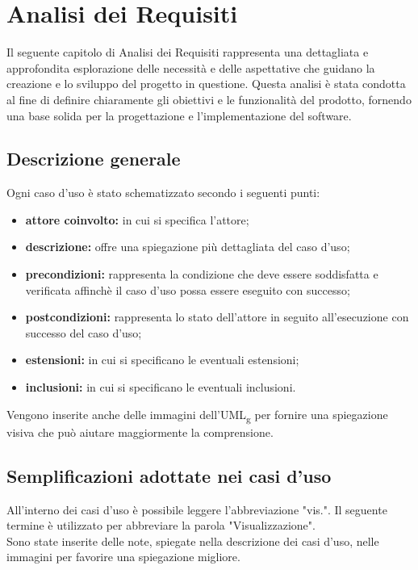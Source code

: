 \chapter{Analisi dei Requisiti}
\label{cap:analisi-requisiti}

Il seguente capitolo di Analisi dei Requisiti rappresenta una dettagliata e approfondita esplorazione delle necessità e delle aspettative che guidano la creazione e lo sviluppo del progetto in questione. Questa analisi è stata condotta al fine di definire chiaramente gli obiettivi e le funzionalità del prodotto, fornendo una base solida per la progettazione e l'implementazione del software.\\

\section{Descrizione generale}
Ogni caso d'uso è stato schematizzato secondo i seguenti punti:
\begin{itemize}
\item \textbf{attore coinvolto:} in cui si specifica l'attore;
\item \textbf{descrizione:} offre una spiegazione più dettagliata del caso d'uso; 
\item \textbf{precondizioni:} rappresenta la condizione che deve essere soddisfatta e verificata affinchè il caso d'uso possa essere eseguito con successo;
\item \textbf{postcondizioni:} rappresenta lo stato dell'attore in seguito all'esecuzione con successo del caso d'uso;
\item \textbf{estensioni:} in cui si specificano le eventuali estensioni;
\item \textbf{inclusioni:} in cui si specificano le eventuali inclusioni.
\end{itemize}
Vengono inserite anche delle immagini dell'UML\textsubscript{g} per fornire una spiegazione visiva che può aiutare maggiormente la comprensione.

\section{Semplificazioni adottate nei casi d'uso}
All'interno dei casi d'uso è possibile leggere l'abbreviazione "vis.". Il seguente termine è utilizzato per abbreviare la parola "Visualizzazione".\\
Sono state inserite delle note, spiegate nella descrizione dei casi d'uso, nelle immagini per favorire una spiegazione migliore.

